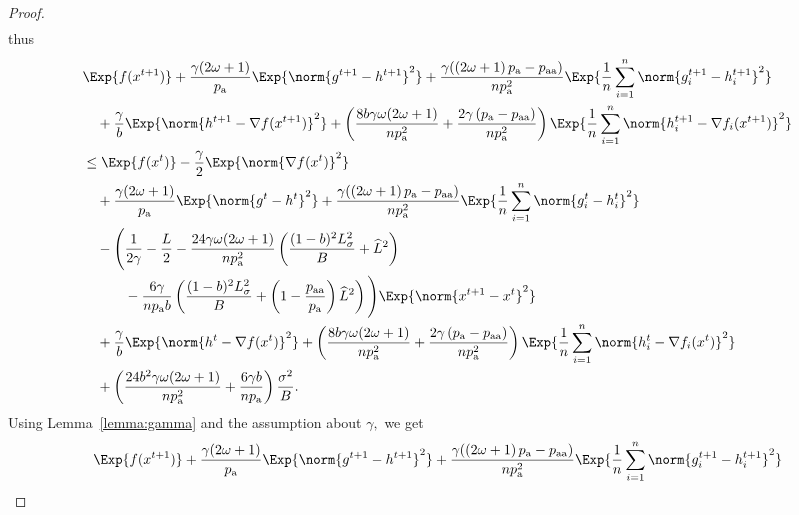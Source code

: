 \documentclass{article}
\newcommand*{\probavailable}{\ensuremath{p_{\textnormal{a}}}}
\newcommand*{\probpairaa}{\ensuremath{p_{\textnormal{aa}}}}
\begin{document}
\begin{proof}
\begin{align*}
    \end{align*}
    thus
    \begin{align*}
      &\Exp{f(x^{t + 1})} + \frac{\gamma (2 \omega + 1)}{\probavailable} \Exp{\norm{g^{t+1} - h^{t+1}}^2} + \frac{\gamma (\left(2 \omega + 1\right)\probavailable - \probpairaa)}{n \probavailable^2} \Exp{\frac{1}{n}\sum_{i=1}^n\norm{g^{t+1}_i - h^{t+1}_i}^2}\\
      &\quad  + \frac{\gamma}{b} \Exp{\norm{h^{t+1} - \nabla f(x^{t+1})}^2} + \left(\frac{8 b \gamma \omega (2 \omega + 1)}{n \probavailable^2} + \frac{2 \gamma \left(\probavailable - \probpairaa\right)}{n \probavailable^2}\right) \Exp{\frac{1}{n}\sum_{i=1}^n\norm{h^{t+1}_i - \nabla f_i(x^{t+1})}^2}\\
      &\leq \Exp{f(x^t)} - \frac{\gamma}{2}\Exp{\norm{\nabla f(x^t)}^2} \\
      &\quad + \frac{\gamma (2 \omega + 1)}{\probavailable} \Exp{\norm{g^{t} - h^{t}}^2} + \frac{\gamma (\left(2 \omega + 1\right)\probavailable - \probpairaa)}{n \probavailable^2} \Exp{\frac{1}{n}\sum_{i=1}^n\norm{g^{t}_i - h^{t}_i}^2} \\
      &\quad - \Bigg(\frac{1}{2\gamma} - \frac{L}{2} - \frac{24 \gamma \omega (2 \omega + 1)}{n \probavailable^2} \left(\frac{(1 - b)^2 L_{\sigma}^2}{B} + \widehat{L}^2\right) \\
      &\qquad\quad - \frac{6 \gamma}{n \probavailable b}\left(\frac{(1 - b)^2 L_{\sigma}^2}{B} + \left(1 - \frac{\probpairaa}{\probavailable}\right) \widehat{L}^2 \right)\Bigg) \Exp{\norm{x^{t+1} - x^t}^2} \\
      &\quad + \frac{\gamma}{b} \Exp{\norm{h^{t} - \nabla f(x^{t})}^2} + \left(\frac{8 b \gamma \omega (2 \omega + 1)}{n \probavailable^2} + \frac{2 \gamma \left(\probavailable - \probpairaa\right)}{n \probavailable^2}\right)\Exp{\frac{1}{n}\sum_{i=1}^n\norm{h^{t}_i - \nabla f_i(x^{t})}^2} \\
      &\quad + \left(\frac{24 b^2 \gamma \omega (2 \omega + 1)}{n \probavailable^2} + \frac{6 \gamma b}{n \probavailable}\right) \frac{\sigma^2}{B}.
    \end{align*}
    Using Lemma~\ref{lemma:gamma} and the assumption about $\gamma,$ we get
    \begin{align*}
      &\Exp{f(x^{t + 1})} + \frac{\gamma (2 \omega + 1)}{\probavailable} \Exp{\norm{g^{t+1} - h^{t+1}}^2} + \frac{\gamma (\left(2 \omega + 1\right)\probavailable - \probpairaa)}{n \probavailable^2} \Exp{\frac{1}{n}\sum_{i=1}^n\norm{g^{t+1}_i - h^{t+1}_i}^2}\\

\end{align*}
\end{proof}
\end{document}
